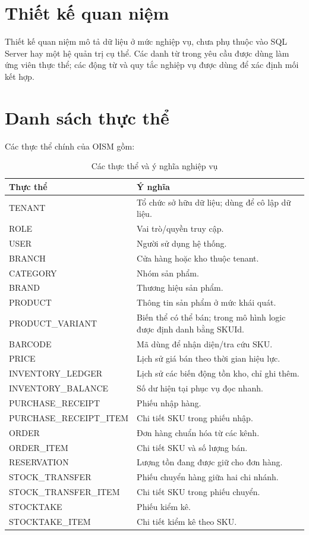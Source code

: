 \section{Thiết kế quan niệm}

Thiết kế quan niệm mô tả dữ liệu ở mức nghiệp vụ, chưa phụ thuộc vào SQL Server hay một hệ quản trị cụ thể. Các danh từ trong yêu cầu được dùng làm ứng viên thực thể; các động từ và quy tắc nghiệp vụ được dùng để xác định mối kết hợp.

\section{Danh sách thực thể}

Các thực thể chính của OISM gồm:

\begin{table}[H]
\centering
\caption{Các thực thể và ý nghĩa nghiệp vụ}
\label{tab:concept-entities}
\small
\begin{tabular}{|p{}|p{}|}
\hline
\textbf{Thực thể} & \textbf{Ý nghĩa} \\
\hline
TENANT & Tổ chức sở hữu dữ liệu; dùng để cô lập dữ liệu. \\
\hline
ROLE & Vai trò/quyền truy cập. \\
\hline
USER & Người sử dụng hệ thống. \\
\hline
BRANCH & Cửa hàng hoặc kho thuộc tenant. \\
\hline
CATEGORY & Nhóm sản phẩm. \\
\hline
BRAND & Thương hiệu sản phẩm. \\
\hline
PRODUCT & Thông tin sản phẩm ở mức khái quát. \\
\hline
PRODUCT\_VARIANT & Biến thể có thể bán; trong mô hình logic được định danh bằng SKUId. \\
\hline
BARCODE & Mã dùng để nhận diện/tra cứu SKU. \\
\hline
PRICE & Lịch sử giá bán theo thời gian hiệu lực. \\
\hline
INVENTORY\_LEDGER & Lịch sử các biến động tồn kho, chỉ ghi thêm. \\
\hline
INVENTORY\_BALANCE & Số dư hiện tại phục vụ đọc nhanh. \\
\hline
PURCHASE\_RECEIPT & Phiếu nhập hàng. \\
\hline
PURCHASE\_RECEIPT\_ITEM & Chi tiết SKU trong phiếu nhập. \\
\hline
ORDER & Đơn hàng chuẩn hóa từ các kênh. \\
\hline
ORDER\_ITEM & Chi tiết SKU và số lượng bán. \\
\hline
RESERVATION & Lượng tồn đang được giữ cho đơn hàng. \\
\hline
STOCK\_TRANSFER & Phiếu chuyển hàng giữa hai chi nhánh. \\
\hline
STOCK\_TRANSFER\_ITEM & Chi tiết SKU trong phiếu chuyển. \\
\hline
STOCKTAKE & Phiếu kiểm kê. \\
\hline
STOCKTAKE\_ITEM & Chi tiết kiểm kê theo SKU. \\
\hline
\end{tabular}
\end{table}

